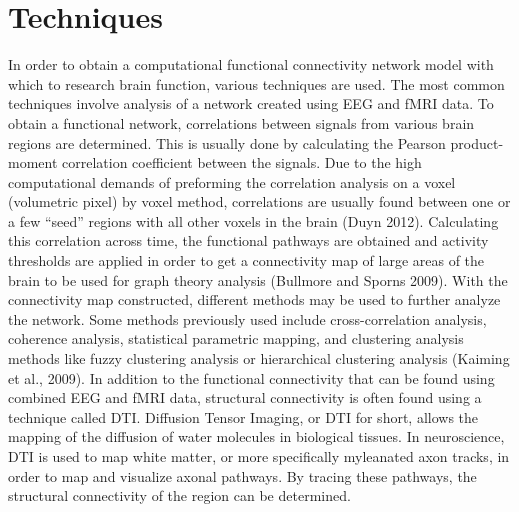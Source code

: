 \documentclass[12pt,letterpaper]{report}
\begin{document}
\section{Techniques}
	In order to obtain a computational functional connectivity network model with which to research brain function, various techniques are used.  The most common techniques involve analysis of a network created using EEG and fMRI data. To obtain a functional network, correlations between signals from various brain regions are determined. This is usually done by calculating the Pearson product-moment correlation coefficient between the signals. Due to the high computational demands of preforming the correlation analysis on a voxel (volumetric pixel) by voxel method, correlations are usually found between one or a few “seed” regions with all other voxels in the brain (Duyn 2012). Calculating this correlation across time, the functional pathways are obtained and activity thresholds are applied in order to get a connectivity map of large areas of the brain to be used for graph theory analysis (Bullmore and Sporns 2009).  With the connectivity map constructed, different methods may be used to further analyze the network. Some methods previously used include cross-correlation analysis, coherence analysis, statistical parametric mapping, and clustering analysis methods like fuzzy clustering analysis or hierarchical clustering analysis (Kaiming et al., 2009).
	In addition to the functional connectivity that can be found using combined EEG and fMRI data, structural connectivity is often found using a technique called DTI. Diffusion Tensor Imaging, or DTI for short, allows the mapping of the diffusion of water molecules in biological tissues. In neuroscience, DTI is used to map white matter, or more specifically myleanated axon tracks, in order to map and visualize axonal pathways. By tracing these pathways, the structural connectivity of the region can be determined.
\end{document}
